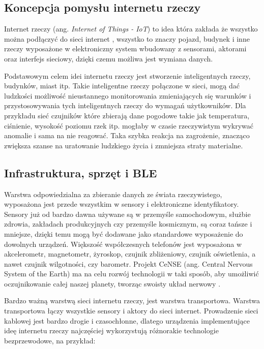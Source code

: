 \subsection{Koncepcja pomysłu internetu rzeczy}

Internet rzeczy (ang. \textit{Internet of Things - IoT}) to idea która zakłada że wszystko można podłączyć do sieci internet \cite{iot}, wszystko to znaczy pojazd, budynek i inne rzeczy wyposażone w elektroniczny system wbudowany z sensorami, aktorami oraz interfejs sieciowy, dzięki czemu możliwa jest wymiana danych. 

Podstawowym celem idei internetu rzeczy jest stworzenie inteligentnych rzeczy, budynków, miast itp. Takie inteligentne rzeczy połączone w sieci, mogą dać ludzkości możliwość nieustannego monitorowania zmieniających się warunków i przystosowywania tych inteligentnych rzeczy do wymagań użytkowników. Dla przykładu sieć czujników które zbierają dane pogodowe takie jak temperatura, ciśnienie, wysokość poziomu rzek itp. mogłaby w czasie rzeczywistym wykrywać anomalie i sama na nie reagować. Taka szybka reakcja na zagrożenie, znacząco zwiększa szanse na uratowanie ludzkiego życia i zmniejsza straty materialne.

\subsection{Infrastruktura, sprzęt i BLE \cite{infrastrukturaiot}}

Warstwa odpowiedzialna za zbieranie danych ze świata rzeczywistego, wyposażona jest przede wszystkim w sensory i elektroniczne identyfikatory. Sensory już od bardzo dawna używane są w przemyśle samochodowym, służbie zdrowia, zakładach produkcyjnych czy przemyśle kosmicznym, są coraz tańsze i mniejsze, dzięki temu mogą być dodawane jako standardowe wyposażenie do dowolnych urządzeń. Większość współczesnych telefonów jest wyposażona w akcelerometr, magnetometr, żyroskop, czujnik zbliżeniowy, czujnik oświetlenia, a nawet czujnik wilgotności, czy barometr. Projekt CeNSE (ang. Central Nervous System of the Earth) ma na celu rozwój technologii w taki sposób, aby umożliwić oczujnikowanie całej naszej planety, tworząc swoisty układ nerwowy \cite{cense}.

Bardzo ważną warstwą sieci internetu rzeczy, jest warstwa transportowa. Warstwa transportowa łączy wszystkie sensory i aktory do sieci internet. Prowadzenie sieci kablowej jest bardzo drogie i czasochłonne, dlatego urządzenia implementujące ideę internetu rzeczy najczęściej wykorzystują różnorakie technologie bezprzewodowe, na przykład:


